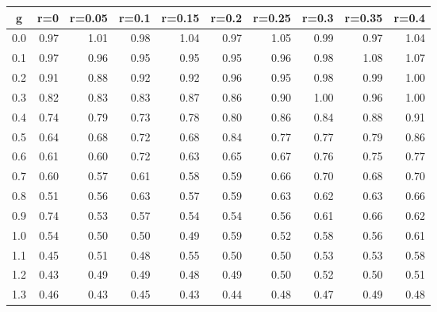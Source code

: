 %
\begin{table}[!tbp]
 \begin{center}
 \begin{tabular}{rrrrrrrrrr}\hline\hline
\multicolumn{1}{c}{g}&\multicolumn{1}{c}{r=0}&\multicolumn{1}{c}{r=0.05}&\multicolumn{1}{c}{r=0.1}&\multicolumn{1}{c}{r=0.15}&\multicolumn{1}{c}{r=0.2}&\multicolumn{1}{c}{r=0.25}&\multicolumn{1}{c}{r=0.3}&\multicolumn{1}{c}{r=0.35}&\multicolumn{1}{c}{r=0.4}\tabularnewline
\hline
0.0&0.97&1.01&0.98&1.04&0.97&1.05&0.99&0.97&1.04\tabularnewline
0.1&0.97&0.96&0.95&0.95&0.95&0.96&0.98&1.08&1.07\tabularnewline
0.2&0.91&0.88&0.92&0.92&0.96&0.95&0.98&0.99&1.00\tabularnewline
0.3&0.82&0.83&0.83&0.87&0.86&0.90&1.00&0.96&1.00\tabularnewline
0.4&0.74&0.79&0.73&0.78&0.80&0.86&0.84&0.88&0.91\tabularnewline
0.5&0.64&0.68&0.72&0.68&0.84&0.77&0.77&0.79&0.86\tabularnewline
0.6&0.61&0.60&0.72&0.63&0.65&0.67&0.76&0.75&0.77\tabularnewline
0.7&0.60&0.57&0.61&0.58&0.59&0.66&0.70&0.68&0.70\tabularnewline
0.8&0.51&0.56&0.63&0.57&0.59&0.63&0.62&0.63&0.66\tabularnewline
0.9&0.74&0.53&0.57&0.54&0.54&0.56&0.61&0.66&0.62\tabularnewline
1.0&0.54&0.50&0.50&0.49&0.59&0.52&0.58&0.56&0.61\tabularnewline
1.1&0.45&0.51&0.48&0.55&0.50&0.50&0.53&0.53&0.58\tabularnewline
1.2&0.43&0.49&0.49&0.48&0.49&0.50&0.52&0.50&0.51\tabularnewline
1.3&0.46&0.43&0.45&0.43&0.44&0.48&0.47&0.49&0.48\tabularnewline
\hline
\end{tabular}

\end{center}

\end{table}

